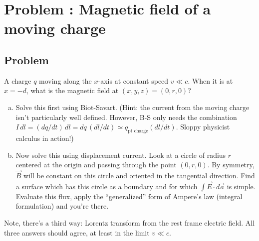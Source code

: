 \documentclass[solutions]{esg8022pset}
\begin{document}
\section{Problem \thesection: Magnetic field of a moving charge}
\subsection{Problem}
  A charge $q$ moving
  along the $x$-axis at constant speed $v \ll c$.  When it is at $x =
  -d$, what is the magnetic field at $(x,y,z) = (0,r,0)$?

  \begin{enumerate}[(a)]
    \item Solve this first using Biot-Savart.  (Hint:
      the current from the moving charge isn't particularly well defined.
      However, B-S only needs the combination $I\,dl = (dq/dt)\,dl = dq\,
      (dl/dt) \simeq q_{\text{pt charge}}(dl/dt)$.  Sloppy physicist calculus
      in action!)
    \item Now solve this using displacement current.
      Look at a circle of radius $r$ centered at the origin and passing
      through the point $(0,r,0)$.  By symmetry, $\vec B$ will be constant
      on this circle and oriented in the tangential direction.  Find a
      surface which has this circle as a boundary and for which $\int \vec
      E\cdot d\vec a$ is simple.  Evaluate this flux, apply the
      ``generalized'' form of Ampere's law (integral formulation) and you're
      there.
  \end{enumerate}

  \noindent Note, there's a third way: Lorentz transform from the
  rest frame electric field.  All
  three answers should agree, at least in the limit $v \ll c$.
\end{document}
